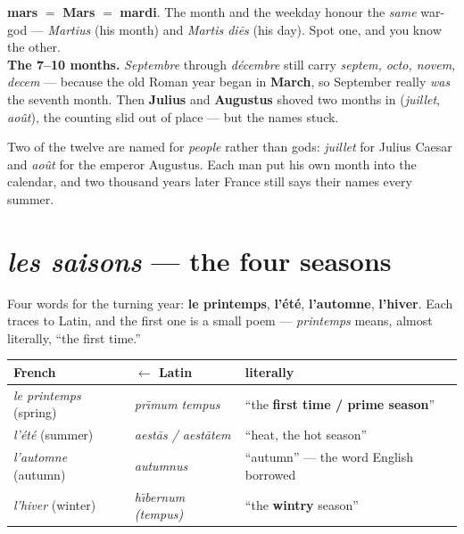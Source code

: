 \begin{cousinweb}
\textbf{mars} $=$ \textbf{Mars} $=$ \textbf{mardi}. The month and the weekday
honour the \emph{same} war-god --- \emph{Martius} (his month) and \emph{Martis
di\=es} (his day). Spot one, and you know the other.\\[3pt]
\textbf{The 7--10 months.} \emph{Septembre} through \emph{d\'{e}cembre} still
carry \emph{septem, octo, novem, decem} --- because the old Roman year began in
\textbf{March}, so September really \emph{was} the seventh month. Then
\textbf{Julius} and \textbf{Augustus} shoved two months in (\emph{juillet},
\emph{ao\^{u}t}), the counting slid out of place --- but the names stuck.
\end{cousinweb}

\begin{culture}
Two of the twelve are named for \emph{people} rather than gods:
\emph{juillet} for Julius Caesar and \emph{ao\^{u}t} for the emperor Augustus.
Each man put his own month into the calendar, and two thousand years later
France still says their names every summer.
\end{culture}

\section{\emph{les saisons} --- the four seasons}
\label{lesson:saisons}

Four words for the turning year: \textbf{le printemps}, \textbf{l'\'{e}t\'{e}},
\textbf{l'automne}, \textbf{l'hiver}. Each traces to Latin, and the first one is
a small poem --- \emph{printemps} means, almost literally, ``the first time.''

\begin{center}
\begin{tabularx}{\linewidth}{@{}ll>{\raggedright\arraybackslash}X@{}}
\toprule
French & $\leftarrow$ Latin & literally \\
\midrule
\emph{le printemps} (spring) & \emph{pr\={\i}mum tempus} & ``the \textbf{first time / prime season}'' \\
\emph{l'\'{e}t\'{e}} (summer) & \emph{aest\=as / aest\=atem} & ``heat, the hot season'' \\
\emph{l'automne} (autumn) & \emph{autumnus} & ``autumn'' --- the word English borrowed \\
\emph{l'hiver} (winter) & \emph{h\={\i}bernum (tempus)} & ``the \textbf{wintry} season'' \\
\bottomrule
\end{tabularx}
\end{center}

